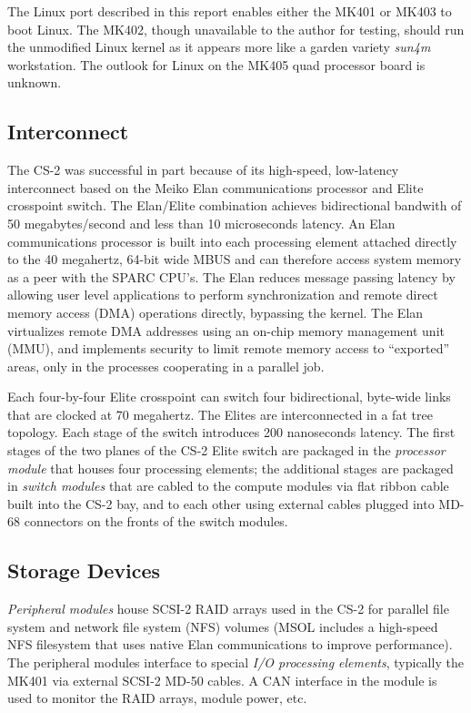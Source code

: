\documentclass{article}
\begin{document}
  The Linux port described in this report enables either the MK401 or MK403
to boot Linux.  The MK402, though unavailable to the author for testing,
should run the unmodified Linux kernel as it appears more like a garden
variety {\em sun4m} workstation.  The outlook for Linux on the 
MK405 quad processor board is unknown.

\subsection{Interconnect}

  The CS-2 was successful in part because of its high-speed, low-latency
interconnect based on the Meiko Elan communications processor\cite{Meiko93b}
and Elite crosspoint switch\cite{Meiko93c}.  
The Elan/Elite combination achieves bidirectional bandwith of
50 megabytes/second and less than 10 microseconds latency.  
An Elan communications processor
is built into each processing element attached directly 
to the 40 megahertz, 64-bit wide MBUS and can therefore access system memory 
as a peer with the SPARC CPU's.  
The Elan reduces message passing latency by
allowing user level applications to perform synchronization and remote direct 
memory access (DMA) operations directly, bypassing the kernel.
The Elan virtualizes remote DMA addresses using an on-chip memory management
unit (MMU), and implements security to limit remote memory access to 
``exported'' areas, only in the processes cooperating in a parallel job.

  Each four-by-four Elite crosspoint can switch four bidirectional, byte-wide
links that are clocked at 70 megahertz.  The Elites are interconnected in a 
fat tree topology.  Each stage of the switch introduces 200 nanoseconds latency.
The first stages of the two planes of the CS-2 Elite switch are packaged in the 
{\em processor module}\cite{Meiko95f} that houses four processing elements;
the additional stages are packaged in {\em switch modules}\cite{Meiko94} 
that are cabled to 
the compute modules via flat ribbon cable built into the CS-2 bay,
and to each other using external cables plugged into MD-68 connectors on 
the fronts of the switch modules.  

\subsection{Storage Devices}

  {\em Peripheral modules}\cite{Meiko95g} house SCSI-2 RAID arrays used in 
the CS-2 for parallel file system and network file system (NFS) volumes 
(MSOL includes a high-speed NFS filesystem that uses native Elan 
communications to improve performance).  The peripheral modules 
interface to special {\em I/O processing elements}, typically the MK401
via external SCSI-2 MD-50 cables.  A CAN interface in the module is used 
to monitor the RAID arrays, module power, etc.
\end{document}
